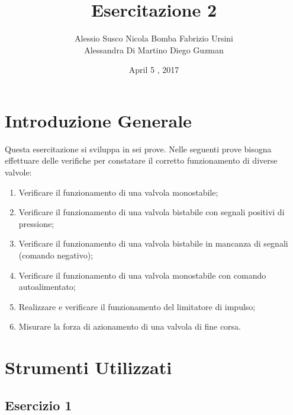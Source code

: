 \documentclass[a4paper]{article}
\begin{document}
\title{Esercitazione 2}
\date{April 5 , 2017}
\maketitle


\author{Alessio Susco \hspace*{2cm} Nicola Bomba \hspace*{2cm} Fabrizio Ursini  \\  \hspace*{1,85cm} Alessandra Di Martino \hspace*{1,25cm} Diego Guzman}

 

\tableofcontents

\clearpage

\section{Introduzione Generale}

Questa esercitazione si sviluppa in sei prove. Nelle seguenti prove bisogna effettuare delle verifiche per constatare il corretto funzionamento di diverse valvole:
\begin{enumerate}
\item Verificare il funzionamento di una valvola monostabile;
\item Verificare il funzionamento di una valvola bistabile con segnali positivi di pressione;
\item Verificare il funzionamento di una valvola bistabile in mancanza di segnali (comando negativo);
\item Verificare il funzionamento di una valvola monostabile con comando autoalimentato;
\item Realizzare e verificare il funzionamento del limitatore di impulso;
\item Misurare la forza di azionamento di una valvola di fine corsa.
\end{enumerate}



\section{Strumenti Utilizzati}

\subsection{Esercizio 1}
\end{document}
